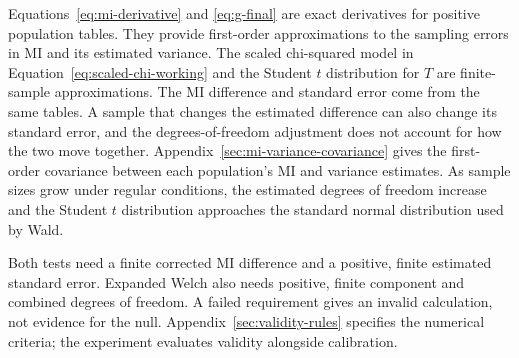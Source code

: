 \begin{samepage}
\medskip
{}

Equations~\eqref{eq:mi-derivative} and \eqref{eq:g-final} are exact
derivatives for positive population tables. They provide first-order
approximations to the sampling errors in MI and its estimated variance.
The scaled chi-squared model in Equation~\eqref{eq:scaled-chi-working} and
the Student \(t\) distribution for \(T\) are finite-sample approximations.
The MI difference and standard error come from the same tables. A sample
that changes the estimated difference can also change its standard error,
and the degrees-of-freedom adjustment does not account for how the two move
together.
Appendix~\ref{sec:mi-variance-covariance} gives the first-order covariance
between each population's MI and variance estimates.
As sample sizes grow under regular conditions, the estimated
degrees of freedom increase and the Student \(t\) distribution approaches the
standard normal distribution used by Wald.
\par\nopagebreak[4]

Both tests need a finite corrected MI difference and a positive, finite
estimated standard error. Expanded Welch also needs positive, finite component
and combined degrees of freedom. A failed requirement gives an invalid
calculation, not evidence for the null.
Appendix~\ref{sec:validity-rules} specifies the numerical criteria;
the experiment evaluates validity alongside calibration.
\par
\end{samepage}
